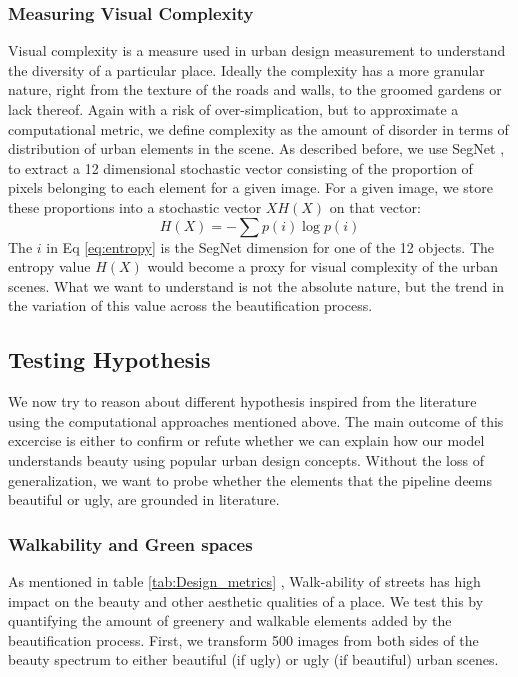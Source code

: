 \subsubsection{Measuring Visual Complexity}
Visual complexity is a measure used in urban design measurement \cite{ewing2013measuring} to understand the diversity of a particular place. Ideally the complexity has a more granular nature, right from the texture of the roads and walls, to the groomed gardens or lack thereof. Again with a risk of over-simplication, but to approximate a computational metric, we define complexity as the amount of disorder in terms of distribution of urban elements in the scene. As described before, we use SegNet \cite{badrinarayanan2015segnet} , to extract a 12 dimensional stochastic vector consisting of the proportion of pixels belonging to each element for a given image.
For a given image, we store these proportions into a stochastic vector $XH(X)$ on that vector:
\begin{equation}
H(X) = -\sum p(i)\log p(i)
\label{eq:entropy} 
\end{equation}
The $i$ in Eq \ref{eq:entropy} is the SegNet dimension for one of the 12 objects. The entropy value $H(X)$ would become a proxy for visual complexity of the urban scenes. What we want to understand is not the absolute nature, but the trend in the variation of this value across the beautification process. 


\subsection{Testing Hypothesis}
We now try to reason about different hypothesis inspired from the literature \cite{ewing2013measuring,alexander1977pattern} using the computational approaches mentioned above. The main outcome of this excercise is either to confirm or refute whether we can explain how our model understands beauty using popular urban design concepts. Without the loss of generalization, we want to probe whether the elements that the pipeline deems beautiful or ugly, are grounded in literature. 

\subsubsection{Walkability and Green spaces}
As mentioned in table \ref{tab:Design_metrics} , Walk-ability of streets has high impact on the beauty and other aesthetic qualities of a place. We test this by quantifying the amount of greenery and walkable elements added by the beautification process.
First, we transform 500 images from both sides of the beauty spectrum to either beautiful (if ugly) or ugly (if beautiful) urban scenes. %


